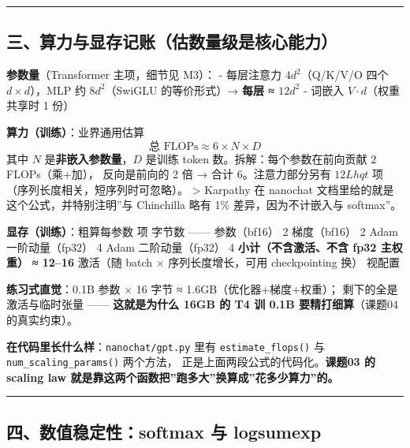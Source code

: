 \documentclass[
  chinese,
  11pt,
]{ctexart}
\begin{document}
\begin{center}\rule{0.5\linewidth}{0.5pt}\end{center}

\subsection{\texorpdfstring{三、算力与显存记账（\textbf{估数量级}是核心能力）}{三、算力与显存记账（估数量级是核心能力）}}\label{ux4e09ux7b97ux529bux4e0eux663eux5b58ux8bb0ux8d26ux4f30ux6570ux91cfux7ea7ux662fux6838ux5fc3ux80fdux529b}

\textbf{参数量}（Transformer 主项，细节见 M3）： - 每层注意力 \(4d^2\)（Q/K/V/O 四个 \(d\times d\)），MLP 约 \(8d^2\)（SwiGLU 的等价形式）→ \textbf{每层 ≈ \(12d^2\)} - 词嵌入 \(V\cdot d\)（权重共享时 1 份）

\textbf{算力（训练）}：业界通用估算 \[\text{总 FLOPs} \approx 6 \times N \times D\] 其中 \(N\) 是\textbf{非嵌入参数量}，\(D\) 是训练 token 数。拆解：每个参数在前向贡献 2 FLOPs（乘+加）， 反向是前向的 2 倍 → 合计 6。注意力部分另有 \(12 L h q t\) 项（序列长度相关，短序列时可忽略）。 \textgreater{} Karpathy 在 nanochat 文档里给的就是这个公式，并特别注明''与 Chinchilla 略有 1\% 差异，因为不计嵌入与 softmax''。

\textbf{显存（训练）}：粗算每参数 \textbar{} 项 \textbar{} 字节数 \textbar{} \textbar---\textbar---\textbar{} \textbar{} 参数（bf16） \textbar{} 2 \textbar{} \textbar{} 梯度（bf16） \textbar{} 2 \textbar{} \textbar{} Adam 一阶动量（fp32） \textbar{} 4 \textbar{} \textbar{} Adam 二阶动量（fp32） \textbar{} 4 \textbar{} \textbar{} \textbf{小计（不含激活、不含 fp32 主权重）} \textbar{} \textbf{≈ 12--16} \textbar{} \textbar{} 激活（随 batch × 序列长度增长，可用 checkpointing 换） \textbar{} 视配置 \textbar{}

\textbf{练习式直觉}：0.1B 参数 × 16 字节 ≈ 1.6GB（优化器+梯度+权重）； 剩下的全是激活与临时张量 ------ \textbf{这就是为什么 16GB 的 T4 训 0.1B 要精打细算}（课题04 的真实约束）。

\textbf{在代码里长什么样}：\texttt{nanochat/gpt.py} 里有 \texttt{estimate\_flops()} 与 \texttt{num\_scaling\_params()} 两个方法， 正是上面两段公式的代码化。\textbf{课题03 的 scaling law 就是靠这两个函数把''跑多大''换算成''花多少算力''的。}

\begin{center}\rule{0.5\linewidth}{0.5pt}\end{center}

\subsection{四、数值稳定性：softmax 与 logsumexp}\label{ux56dbux6570ux503cux7a33ux5b9aux6027softmax-ux4e0e-logsumexp}
\end{document}
